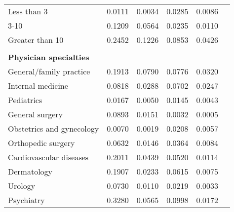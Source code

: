 \documentclass[12pt]{report}
\begin{document}
{\begin{center}
\begin{longtable}{lccccc}
Less than 3                            & 0.0111                   & 0.0034              & 0.0285                    & 0.0086               \\
3-10                                   & 0.1209                   & 0.0564              & 0.0235                    & 0.0110               \\
Greater than 10                        & 0.2452                   & 0.1226              & 0.0853                    & 0.0426               \\
                                       &                          &                     &                           &                      \\
\textbf{Physician specialties}         &                          &                     &                           &                      \\
General/family practice                & 0.1913                   & 0.0790              & 0.0776                    & 0.0320               \\
Internal medicine                      & 0.0818                   & 0.0288              & 0.0702                    & 0.0247               \\
Pediatrics                             & 0.0167                   & 0.0050              & 0.0145                    & 0.0043               \\
General surgery                        & 0.0893                   & 0.0151              & 0.0032                    & 0.0005               \\
Obstetrics and gynecology              & 0.0070                   & 0.0019              & 0.0208                    & 0.0057               \\
Orthopedic surgery                     & 0.0632                   & 0.0146              & 0.0364                    & 0.0084               \\
Cardiovascular diseases                & 0.2011                   & 0.0439              & 0.0520                    & 0.0114               \\
Dermatology                            & 0.1907                   & 0.0233              & 0.0615                    & 0.0075               \\
Urology                                & 0.0730                   & 0.0110              & 0.0219                    & 0.0033               \\
Psychiatry                             & 0.3280                   & 0.0565              & 0.0998                    & 0.0172               \\

\end{longtable}
\end{center}}
\end{document}
